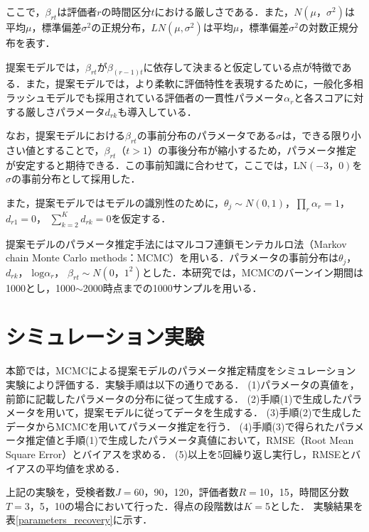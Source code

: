 \documentclass[dvipdfmx, twocolumn, a4paper]{hcresume}
\begin{document}
ここで，$\beta_{rt}$は評価者$r$の時間区分$t$における厳しさである．また，$N(\mu，\sigma^2)$は平均$\mu$，標準偏差$\sigma^2$の正規分布，$LN(\mu,\sigma^2)$は平均$\mu$，標準偏差$\sigma^2$の対数正規分布を表す．

提案モデルでは，$\beta_{rt}$が$\beta_{(r-1)t}$に依存して決まると仮定している点が特徴である．また，提案モデルでは，より柔軟に評価特性を表現するために，一般化多相ラッシュモデルでも採用されている評価者の一貫性パラメータ$\alpha_r$と各スコアに対する厳しさパラメータ$d_{rk}$も導入している．

なお，提案モデルにおける$\beta_{rt}$の事前分布のパラメータである$\sigma$は，できる限り小さい値とすることで，$\beta_{rt}（t>1）$の事後分布が縮小するため，パラメータ推定が安定すると期待できる．この事前知識に合わせて，ここでは，$\mathrm{LN}(-3，0)$を$\sigma$の事前分布として採用した．

また，提案モデルではモデルの識別性のために，$\theta_{j}\sim N(0,1)$，$\prod_{r}\alpha_r=1$， $d_{r1}=0$， $\sum_{k=2}^{K}d_{rk}=0$を仮定する．

提案モデルのパラメータ推定手法にはマルコフ連鎖モンテカルロ法（Markov chain Monte Carlo methods：MCMC）を用いる．パラメータの事前分布は$\theta_{j}$， $d_{rk}$， $\mathrm{log}\alpha_{r}$， $\beta_{rt}\sim N(0，1^{2})$とした．本研究では，MCMCのバーンイン期間は1000とし，1000$\sim$2000時点までの1000サンプルを用いる．
\section{シミュレーション実験}

本節では，MCMCによる提案モデルのパラメータ推定精度をシミュレーション実験により評価する．実験手順は以下の通りである．
(1)パラメータの真値を，前節に記載したパラメータの分布に従って生成する．
(2)手順(1)で生成したパラメータを用いて，提案モデルに従ってデータを生成する．
(3)手順(2)で生成したデータからMCMCを用いてパラメータ推定を行う．
(4)手順(3)で得られたパラメータ推定値と手順(1)で生成したパラメータ真値において，RMSE（Root Mean Square Error）とバイアスを求める．
(5)以上を5回繰り返し実行し，RMSEとバイアスの平均値を求める．

上記の実験を，受検者数$J=$60，90，120，評価者数$R=$10，15，時間区分数$T=$3，5，10の場合において行った．得点の段階数は$K=$5とした．
実験結果を表\ref{parameters_recovery}に示す．
\end{document}
